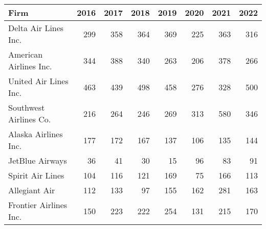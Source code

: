 
\begin{tabular}{lrrrrrrr}
\toprule
Firm & 2016 & 2017 & 2018 & 2019 & 2020 & 2021 & 2022\\
\midrule
Delta Air Lines Inc. & 299 & 358 & 364 & 369 & 225 & 363 & 316\\
American Airlines Inc. & 344 & 388 & 340 & 263 & 206 & 378 & 266\\
United Air Lines Inc. & 463 & 439 & 498 & 458 & 276 & 328 & 500\\
Southwest Airlines Co. & 216 & 264 & 246 & 269 & 313 & 580 & 346\\
Alaska Airlines Inc. & 177 & 172 & 167 & 137 & 106 & 135 & 144\\
\addlinespace
JetBlue Airways & 36 & 41 & 30 & 15 & 96 & 83 & 91\\
Spirit Air Lines & 104 & 116 & 121 & 169 & 75 & 166 & 113\\
Allegiant Air & 112 & 133 & 97 & 155 & 162 & 281 & 163\\
Frontier Airlines Inc. & 150 & 223 & 222 & 254 & 131 & 215 & 170\\
\bottomrule
\end{tabular}
